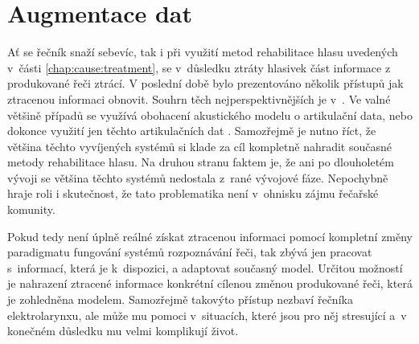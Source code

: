 \section{Augmentace dat}
\label{chap:realisation:augmentation}


Ať se řečník snaží sebevíc, tak i při využití metod rehabilitace hlasu uvedených v~části \ref{chap:cause:treatment}, se v~důsledku ztráty hlasivek část informace z produkované řeči ztrácí.
V poslední době bylo prezentováno několik přístupů jak ztracenou informaci obnovit.
Souhrn těch nejperspektivnějších je v~\cite{Denby2010}.
Ve valné většině případů se využívá obohacení akustického modelu o artikulační data, nebo dokonce využití jen těchto artikulačních dat \cite{Hofe2013} .
Samozřejmě je nutno říct, že většina těchto vyvíjených systémů si klade za cíl kompletně nahradit současné metody rehabilitace hlasu.
Na druhou stranu faktem je, že ani po dlouholetém vývoji se většina těchto systémů nedostala z~rané vývojové fáze.
Nepochybně hraje roli i skutečnost, že tato problematika není v~ohnisku zájmu řečařské komunity.

Pokud tedy není úplně reálné získat ztracenou informaci pomocí kompletní změny paradigmatu fungování systémů rozpoznávání řeči, tak zbývá jen pracovat s~informací, která je  k~dispozici, a adaptovat současný model.
Určitou možností je nahrazení ztracené informace konkrétní cílenou změnou produkované řeči,
která je zohledněna modelem.
Samozřejmě takovýto přístup nezbaví řečníka elektrolarynxu, ale může mu pomoci v~situacích, které jsou pro něj stresující a~v konečném důsledku mu velmi komplikují život.

